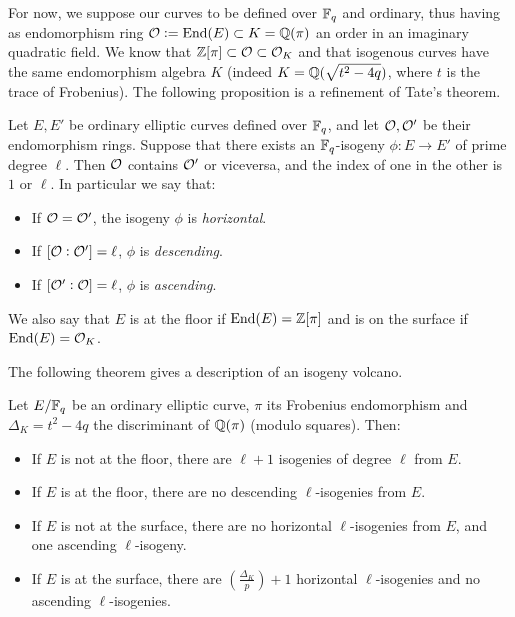 For now, we suppose our curves to be defined over $\mathbb{F}_q$ and ordinary, thus having as endomorphism ring $\mathcal{O}:=\operatorname{End}(E)\subset K=\mathbb{Q}(\pi)$ an order in an imaginary quadratic field. We know that $\mathbb{Z}[\pi]\subset \mathcal{O}\subset\mathcal{O}_K$ and that isogenous curves have the same endomorphism algebra $K$ (indeed $K=\mathbb{Q}(\sqrt{t^2-4q})$, where $t$ is the trace of Frobenius). The following proposition is a refinement of Tate's theorem.
\begin{proposition}
    Let $E,E'$ be ordinary elliptic curves defined over $\mathbb{F}_q$, and let $\mathcal{O},\mathcal{O}'$ be their endomorphism rings. Suppose that there exists an $\mathbb{F}_q$-isogeny $\phi:E\to E'$ of prime degree $\ell$. Then $\mathcal{O}$ contains $\mathcal{O}'$ or viceversa, and the index of one in the other is $1$ or $\ell$. In particular we say that:
    \begin{itemize}
        \item If $\mathcal{O}=\mathcal{O}'$, the isogeny $\phi$ is \emph{horizontal}.
        \item If $[\mathcal{O}:\mathcal{O}']=\ell$, $\phi$ is \emph{descending}.
        \item If $[\mathcal{O}':\mathcal{O}]=\ell$, $\phi$ is \emph{ascending}.
    \end{itemize}
\end{proposition}
We also say that $E$ is at the floor if $\operatorname{End}(E)=\mathbb{Z}[\pi]$ and is on the surface if $\operatorname{End}(E)=\mathcal{O}_K$.

The following theorem gives a description of an isogeny volcano.
\begin{theorem}
    Let $E/\mathbb{F}_q$ be an ordinary elliptic curve, $\pi$ its Frobenius endomorphism and $\Delta_K=t^2-4q$ the discriminant of $\mathbb{Q}(\pi)$ (modulo squares). Then:
    \begin{itemize}
        \item If $E$ is not at the floor, there are $\ell+1$ isogenies of degree $\ell$ from $E$.
        \item If $E$ is at the floor, there are no descending $\ell$-isogenies from $E$.
        \item If $E$ is not at the surface, there are no horizontal $\ell$-isogenies from $E$, and one ascending $\ell$-isogeny.
        \item If $E$ is at the surface, there are $\left( \frac{\Delta_K}{p} \right)+1$ horizontal $\ell$-isogenies and no ascending $\ell$-isogenies.
    \end{itemize}
\end{theorem}

